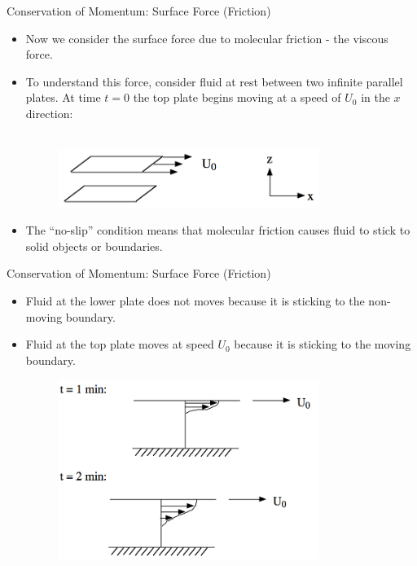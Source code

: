 \begin{frame}{Conservation of Momentum: Surface Force (Friction)}
\begin{itemize}
	\item Now we consider the surface force due to molecular friction - the viscous force.
	\item To understand this force, consider fluid at rest between two infinite parallel plates. At time $t=0$ the top plate begins moving at a speed of $U_0$ in the $x$ direction:
	~\\~\\
	\begin{figure}
		\includegraphics[width=0.8\textwidth]{friction1.png}
	\end{figure}
	\item The ``no-slip'' condition means that molecular friction causes fluid to stick to solid objects or boundaries.
\end{itemize}
\end{frame}
\begin{frame}{Conservation of Momentum: Surface Force (Friction)}
\begin{itemize}
	\item Fluid at the lower plate does not moves because it is sticking to the non-moving boundary.
	\item Fluid at the top plate moves at speed $U_0$ because it is sticking to the moving boundary.
	\begin{figure}
		\includegraphics[width=0.8\textwidth]{friction2.png}
	\end{figure}
\end{itemize}
\end{frame}
